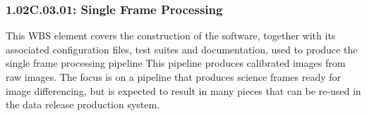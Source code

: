\subsubsection{1.02C.03.01: Single Frame Processing}

This WBS element covers the construction of the software,
together with its associated configuration files, test suites and
documentation, used to produce the single frame processing pipeline
This pipeline produces calibrated images from raw images.  The
focus is on a pipeline that produces science frames ready for image
differencing, but is expected to result in many pieces that can be re-used
in the data release production system.
